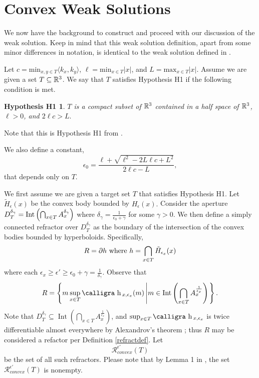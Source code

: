 \documentclass[review]{elsarticle}
\DeclareMathOperator*{\Int}{Int}
\newtheorem*{h1*}{Hypothesis H1}
\newcommand{\h}{\text{\calligra h}\,}
\begin{document}
\section{Convex Weak Solutions}

We now have the background to construct and proceed with our discussion of the weak solution. Keep in mind that this weak solution definition, apart from some minor differences in notation, is identical to the weak solution defined in \cite{KOT}. 

Let $c=\text{min}_{x,y\in T} \langle k_x,k_y\rangle$, $\ell=\text{min}_{x\in T} |x|$, and $L=\text{max}_{x\in T} |x|$. Assume we are given a set $T\subseteq \mathbb{R}^3$. We say that $T$ satisfies Hypothesis H1 if the following condition is met. 

\begin{h1*}
$T$ is a compact subset of $\mathbb{R}^3$ contained in a half space of $\mathbb{R}^3$, $\ell>0$, and $2\ell c>L.$
\end{h1*}

 Note that this is Hypothesis H1 from \cite{KOT}.
 
 We also define a constant,
\begin{equation}\label{e0}
    \epsilon_0 = \frac{\ell+\sqrt{\ell^2 -2L\ell c+L^2}}{2\ell c-L},
\end{equation}
that depends only on $T$.

We first assume we are given a target set $T$ that satisfies Hypothesis H1. Let $\tilde{H}_\epsilon(x)$ be the convex body bounded by ${H}_\epsilon(x).$ Consider the aperture $D_T^{\delta_\gamma}= \textnormal{Int}\left(\bigcap_{x\in T} A_x^{\delta_\gamma} \right)$ where $\delta_\gamma=\frac{1}{\epsilon_0+\gamma}$ for some $\gamma>0$. We then define a simply connected refractor over $D_T^{\delta_\gamma}$ as the boundary of the intersection of the convex bodies bounded by hyperboloids. Specifically,
\begin{equation}\label{refrdef3}
   R=\partial h \textnormal{ where }h=\bigcap_{x\in T}\tilde{H}_{\epsilon_x}(x)
\end{equation}
where each $\epsilon_x\ge\epsilon'\ge\epsilon_0+\gamma=\frac1{\delta_\gamma}$. Observe that 
\begin{equation}\label{equRconvex}
    R=\left\{m\sup_{x\in T}\h_{x,\epsilon_x}(m)\left|m\in \Int\left(\bigcap_{x\in T} A_x^{\frac1{\epsilon_x}}\right)\right.\right\}.
\end{equation}
Note that $D_T^{\delta_\gamma}\subseteq\Int\left(\bigcap_{x\in T} A_x^{\frac1{\epsilon_x}}\right)$, and $\sup_{x\in T}\h_{x,\epsilon_x}$ is twice differentiable almost everywhere by Alexandrov's theorem \cite{convex}; thus $R$ may be considered a refactor per Definition \ref{refractdef}. Let 
\begin{equation}\label{convexWeakSet}
    \mathcal{R}_{convex}^{\epsilon'}(T)
\end{equation}
be the set of all such refractors. Please note that by Lemma 1 in \cite{KOT}, the set $\mathcal{R}_{convex}^{\epsilon'}(T)$ is nonempty. 
\end{document}
